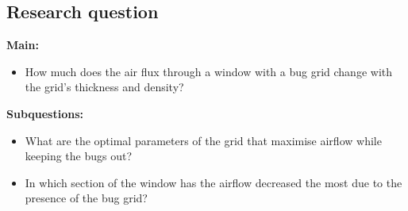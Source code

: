 \subsection{Research question}
\textbf{Main:}
\begin{itemize}
    \item How much does the air flux through a window with a bug grid change with the grid's thickness and density?
\end{itemize}
\textbf{Subquestions:}
\begin{itemize}
    \item What are the optimal parameters of the grid that maximise airflow while keeping the bugs out?
    \item In which section of the window has the airflow decreased the most due to the presence of the bug grid?
\end{itemize}
